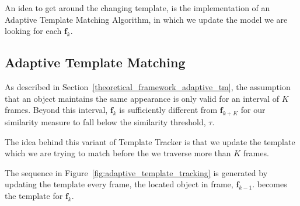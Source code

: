 An idea to get around the changing template, is the implementation of an
Adaptive Template Matching Algorithm, in which we update the model we are
looking for each $\mathbf{f}_k$.

\subsection{Adaptive Template Matching}\label{results_adaptive_template_matching}
As described in Section~\ref{theoretical_framework_adaptive_tm}, the assumption
that an object maintains the same appearance is only valid for an interval of
$K$ frames. Beyond this interval, $\mathbf{f}_{k}$ is sufficiently different
from $\mathbf{f}_{k+K}$ for our similarity measure to fall below the similarity
threshold, $\tau$.

The idea behind this variant of Template Tracker is that we update the
template which we are trying to match before the we traverse more than
$K$ frames.

The sequence in Figure~\ref{fig:adaptive_template_tracking} is generated by
updating the template every frame, the located object in frame,
$\mathbf{f}_{k-1}$. becomes the template for $\mathbf{f}_k$.

